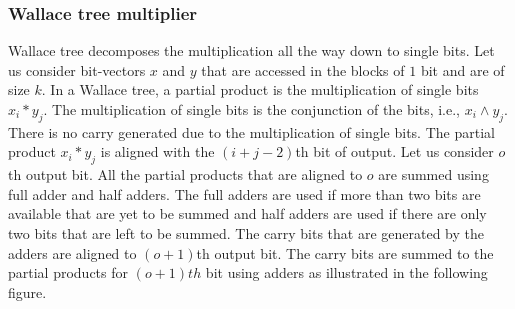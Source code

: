 \subsubsection{Wallace tree multiplier\cite{wallace}}
%
Wallace tree decomposes the multiplication all the way down to single bits.
%
Let us consider bit-vectors $x$ and $y$ that are accessed in the blocks of $1$
bit and are of size $k$.
%
In a Wallace tree, a partial product is the multiplication of single
bits $x_i*y_j$.
%
The multiplication of single bits is the conjunction of the bits, i.e.,
$x_i \land y_j$.
%
There is no carry generated due to the multiplication of single bits.
%
The partial product $x_i*y_j$ is aligned with the $(i+j-2)$th bit of output.
%
Let us consider $o$th output bit.
%
All the partial products that are aligned to $o$ are summed using full adder 
and half adders.
%
The full adders are used
if more than two bits are available that are yet to be summed
and half adders are used if there are only two bits that are left to be summed.
%
The carry bits that are generated by the adders are aligned to
$(o+1)$th output bit.
%
The carry bits are summed to the partial products for $(o+1)th$ bit
using adders as illustrated in the following figure.

\begin{center}
\end{center}

